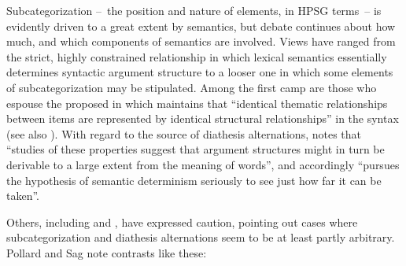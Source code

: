 \documentclass[output=paper
	        ,collection
	        ,collectionchapter
 	        ,biblatex
                ,babelshorthands
                ,newtxmath
                ,draftmode
                ,colorlinks, citecolor=brown
]{langscibook}
\begin{document}
Subcategorization --~the position and nature of \argst elements, in HPSG terms~-- is evidently driven to a great extent by semantics,
but debate continues about how much, and which components of semantics are involved.
Views have ranged from the strict, highly constrained relationship in which lexical semantics essentially determines syntactic argument structure to a looser one in which some elements of subcategorization may be stipulated.
Among  the first camp are those who espouse the   proposed in \citet[46]{Baker1988} which maintains that ``identical thematic relationships between items are represented by identical structural relationships'' in the syntax (see also \citealt{Baker1997}).
With regard to the source of  diathesis alternations, \citet[12--13]{Levin1993} notes that ``studies of these properties suggest that argument structures might in turn be derivable to a large extent from the meaning of words'', and accordingly ``pursues the hypothesis of semantic determinism seriously to see just how far it can be taken''.

Others, including \citet[Section 5.3]{pollard+sag:1987} and \citet[Section 5.1]{Davis2001}, have expressed caution, pointing out cases where subcategorization and diathesis alternations  seem to be at least partly arbitrary.
Pollard and Sag note contrasts like these:
\end{document}
